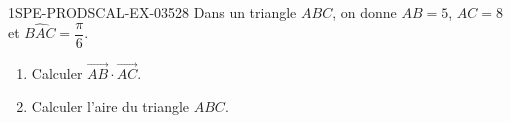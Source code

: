 \begin{exercice}{1SPE-PRODSCAL-EX-035}{2}{8}
Dans un triangle $ABC$, on donne $AB = 5$, $AC = 8$ et $\widehat{BAC} = \dfrac{\pi}{6}$.
\begin{enumerate}
  \item Calculer $\overrightarrow{AB} \cdot \overrightarrow{AC}$.
  \item Calculer l'aire du triangle $ABC$.
\end{enumerate}
\end{exercice}

